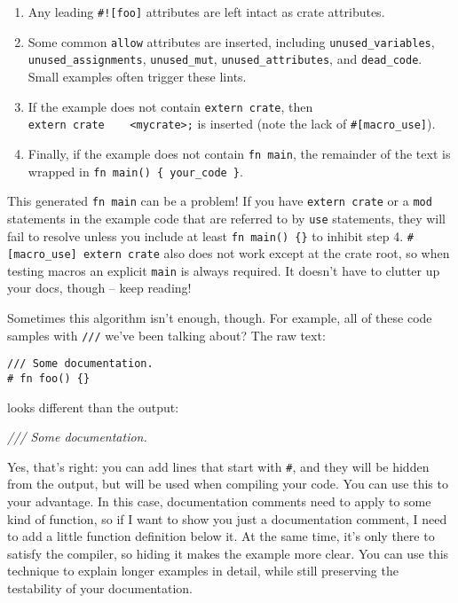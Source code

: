 \documentclass[a4paper,]{book}
\newenvironment{Shaded}{\begin{snugshade}}{\end{snugshade}}
\newcommand{\CommentTok}[1]{\textcolor[rgb]{0.56,0.35,0.01}{\textit{{#1}}}}
\begin{document}
\begin{enumerate}
\def\labelenumi{\arabic{enumi}.}
\itemsep1pt\parskip0pt
\item
  Any leading \texttt{\#!{[}foo{]}} attributes are left intact as crate
  attributes.
\item
  Some common \texttt{allow} attributes are inserted, including
  \texttt{unused\_variables}, \texttt{unused\_assignments},
  \texttt{unused\_mut}, \texttt{unused\_attributes}, and
  \texttt{dead\_code}. Small examples often trigger these lints.
\item
  If the example does not contain \texttt{extern\ crate}, then
  \texttt{extern\ crate\ \ \ \ \textless{}mycrate\textgreater{};} is
  inserted (note the lack of \texttt{\#{[}macro\_use{]}}).
\item
  Finally, if the example does not contain \texttt{fn\ main}, the
  remainder of the text is wrapped in
  \texttt{fn\ main()\ \{\ your\_code\ \}}.
\end{enumerate}

This generated \texttt{fn\ main} can be a problem! If you have
\texttt{extern\ crate} or a \texttt{mod} statements in the example code
that are referred to by \texttt{use} statements, they will fail to
resolve unless you include at least \texttt{fn\ main()\ \{\}} to inhibit
step 4. \texttt{\#{[}macro\_use{]}\ extern\ crate} also does not work
except at the crate root, so when testing macros an explicit
\texttt{main} is always required. It doesn't have to clutter up your
docs, though -- keep reading!

Sometimes this algorithm isn't enough, though. For example, all of these
code samples with \texttt{///} we've been talking about? The raw text:

\begin{verbatim}
/// Some documentation.
# fn foo() {}
\end{verbatim}

looks different than the output:

\begin{Shaded}
\begin{Highlighting}[]
\CommentTok{/// Some documentation.}
\end{Highlighting}
\end{Shaded}

Yes, that's right: you can add lines that start with \texttt{\#}, and
they will be hidden from the output, but will be used when compiling
your code. You can use this to your advantage. In this case,
documentation comments need to apply to some kind of function, so if I
want to show you just a documentation comment, I need to add a little
function definition below it. At the same time, it's only there to
satisfy the compiler, so hiding it makes the example more clear. You can
use this technique to explain longer examples in detail, while still
preserving the testability of your documentation.
\end{document}
